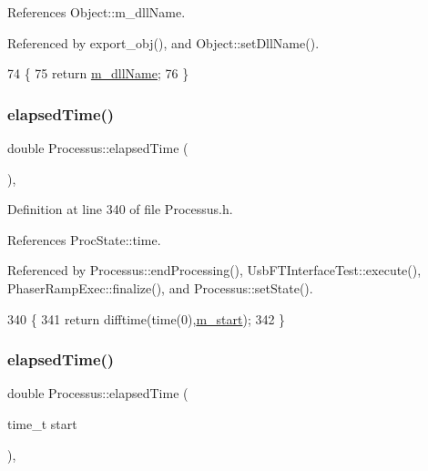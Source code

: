References Object\+::m\+\_\+dll\+Name.



Referenced by export\+\_\+obj(), and Object\+::set\+Dll\+Name().


\begin{DoxyCode}
74                        \{
75     \textcolor{keywordflow}{return} \hyperlink{classObject_a01afbeacebb8db6831559972ec362eb3}{m\_dllName};
76   \}  
\end{DoxyCode}
\mbox{\label{classProcessus_aecca96218c65bc805c988cd95447df55}} 
\subsubsection{\texorpdfstring{elapsed\+Time()}{elapsedTime()}\hspace{0.1cm}{\footnotesize\ttfamily [1/2]}}
{\footnotesize\ttfamily double Processus\+::elapsed\+Time (\begin{DoxyParamCaption}{ }\end{DoxyParamCaption})\hspace{0.3cm}{\ttfamily [inline]}, {\ttfamily [inherited]}}



Definition at line 340 of file Processus.\+h.



References Proc\+State\+::time.



Referenced by Processus\+::end\+Processing(), Usb\+F\+T\+Interface\+Test\+::execute(), Phaser\+Ramp\+Exec\+::finalize(), and Processus\+::set\+State().


\begin{DoxyCode}
340                        \{
341     \textcolor{keywordflow}{return} difftime(time(0),\hyperlink{classProcessus_a8ec00b2e12c5beada932610f30218e93}{m\_start});
342   \}
\end{DoxyCode}
\mbox{\label{classProcessus_a06d3815ad56593dfd0d3c1f534f8b146}} 
\subsubsection{\texorpdfstring{elapsed\+Time()}{elapsedTime()}\hspace{0.1cm}{\footnotesize\ttfamily [2/2]}}
{\footnotesize\ttfamily double Processus\+::elapsed\+Time (\begin{DoxyParamCaption}\item[{time\+\_\+t}]{start }\end{DoxyParamCaption})\hspace{0.3cm}{\ttfamily [inline]}, {\ttfamily [inherited]}}



